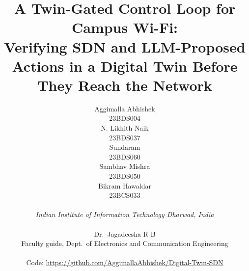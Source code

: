 \documentclass[conference]{IEEEtran}
\makeatletter
\newcommand{\person}[2]{\begin{tabular}[t]{@{}c@{}}#1\\ {\small #2}\end{tabular}}
\makeatother
\begin{document}
\title{A Twin-Gated Control Loop for Campus Wi-Fi:\\ Verifying SDN and LLM-Proposed Actions in a Digital Twin Before They Reach the Network}

\author{%
\person{Aggimalla Abhishek}{23BDS004}\hspace{2em}%
\person{N. Likhith Naik}{23BDS037}\hspace{2em}%
\person{Sundaram}{23BDS060}\hspace{2em}%
\person{Sambhav Mishra}{23BDS050}\hspace{2em}%
\person{Bikram Hawaldar}{23BCS033}\\[0.8ex]
{\itshape Indian Institute of Information Technology Dharwad, India}\\[1.0ex]
\person{Dr.\ Jagadeesha R B}{Faculty guide, Dept.\ of Electronics and Communication Engineering}\\[0.8ex]
{\small Code: \url{https://github.com/AggimallaAbhishek/Digital-Twin-SDN}}%
}

\maketitle
\end{document}
